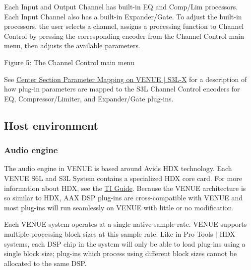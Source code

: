  Each Input and Output Channel has built-\/in E\+Q and Comp/\+Lim processors. Each Input Channel also has a built-\/in Expander/\+Gate. To adjust the built-\/in processors, the user selects a channel, assigns a processing function to Channel Control by pressing the corresponding encoder from the Channel Control main menu, then adjusts the available parameters.

  Figure 5\+: The Channel Control main menu

 See \hyperlink{a00363_aax_page_table_guide_04_avid_center_section_page_tables_venue_s3l_mapping}{Center Section Parameter Mapping on V\+E\+N\+U\+E $\vert$ S3\+L-\/\+X} for a description of how plug-\/in parameters are mapped to the S3\+L Channel Control encoders for E\+Q, Compressor/\+Limiter, and Expander/\+Gate plug-\/ins.



 \hypertarget{a00377_aax_venue_guide__environment}{}\subsection{Host environment}\label{a00377_aax_venue_guide__environment}
\hypertarget{a00377_aax_venue_guide__environment__audio_engine}{}\subsubsection{Audio engine}\label{a00377_aax_venue_guide__environment__audio_engine}
 The audio engine in V\+E\+N\+U\+E is based around Avid\textquotesingle{}s H\+D\+X technology. Each V\+E\+N\+U\+E S6\+L and S3\+L System contains a specialized H\+D\+X core card. For more information about H\+D\+X, see the \hyperlink{a00362}{T\+I Guide}. Because the V\+E\+N\+U\+E architecture is so similar to H\+D\+X, A\+A\+X D\+S\+P plug-\/ins are cross-\/compatible with V\+E\+N\+U\+E and most plug-\/ins will run seamlessly on V\+E\+N\+U\+E with little or no modification.

 Each V\+E\+N\+U\+E system operates at a single native sample rate. V\+E\+N\+U\+E supports multiple processing block sizes at this sample rate. Like in Pro Tools $\vert$ H\+D\+X systems, each D\+S\+P chip in the system will only be able to load plug-\/ins using a single block size; plug-\/ins which process using different block sizes cannot be allocated to the same D\+S\+P.

